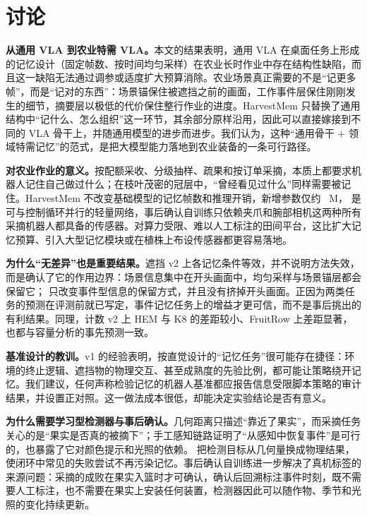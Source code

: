 \section{讨论}
\label{sec:discussion}

\textbf{从通用 VLA 到农业特需 VLA。}本文的结果表明，通用 VLA 在桌面任务上形成的记忆设计（固定帧数、按时间均匀采样）在农业长时作业中存在结构性缺陷，而且这一缺陷无法通过调参或适度扩大预算消除。农业场景真正需要的不是“记更多帧”，而是“记对的东西”：场景锚保住被遮挡之前的画面，工作事件层保住刚刚发生的细节，摘要层以极低的代价保住整行作业的进度。HarvestMem 只替换了通用结构中“记什么、怎么组织”这一环节，其余部分原样沿用，因此可以直接嫁接到不同的 VLA 骨干上，并随通用模型的进步而进步。我们认为，这种“通用骨干 + 领域特需记忆”的范式，是把大模型能力落地到农业装备的一条可行路径。

\textbf{对农业作业的意义。}按配额采收、分级抽样、疏果和按订单采摘，本质上都要求机器人记住自己做过什么；在枝叶茂密的冠层中，“曾经看见过什么”同样需要被记住。HarvestMem 不改变基础模型的记忆帧数和推理开销，新增参数仅约 ~M，\pedet{} 是可与控制循环并行的轻量网络，事后确认自训练只依赖夹爪和腕部相机这两种所有采摘机器人都具备的传感器。对算力受限、难以人工标注的田间平台，这比扩大记忆预算、引入大型记忆模块或在植株上布设传感器都更容易落地。

\textbf{为什么“无差异”也是重要结果。}遮挡 v2 上各记忆条件等效，并不说明方法失效，而是确认了它的作用边界：场景信息集中在开头画面中，均匀采样与场景锚层都会保留它；\hem{} 只改变事件型信息的保留方式，并且没有挤掉开头画面。正因为两类任务的预测在评测前就已写定，事件记忆任务上的增益才更可信，而不是事后挑出的有利结果。同理，计数 v2 上 HEM 与 K8 的差距较小、FruitRow 上差距显著，也都与容量分析的事先预测一致。

\textbf{基准设计的教训。}v1 的经验表明，按直觉设计的“记忆任务”很可能存在捷径：环境的终止逻辑、遮挡物的物理交互、甚至成熟度的先验比例，都可能让策略绕开记忆。我们建议，任何声称检验记忆的机器人基准都应报告信息受限脚本策略的审计结果，并设置正对照。这一做法成本很低，却能决定实验结论是否有意义。

\textbf{为什么需要学习型检测器与事后确认。}几何距离只描述“靠近了果实”，而采摘任务关心的是“果实是否真的被摘下”；手工感知链路证明了“从感知中恢复事件”是可行的，也暴露了它对颜色提示和光照的依赖。\pedet{} 把检测目标从几何量换成物理结果，使闭环中常见的失败尝试不再污染记忆。事后确认自训练进一步解决了真机标签的来源问题：采摘的成败在果实入篮时才可确认，确认后回溯标注事件时刻，既不需要人工标注，也不需要在果实上安装任何装置，检测器因此可以随作物、季节和光照的变化持续更新。

